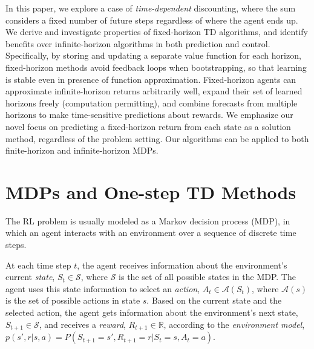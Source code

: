 \documentclass[letterpaper]{article} %
\begin{document}
In this paper, we explore a case of \textit{time-dependent} discounting, where the sum considers a fixed number of future steps regardless of where the agent ends up. We derive and investigate properties of fixed-horizon TD algorithms, and identify benefits over infinite-horizon algorithms in both prediction and control.
%
Specifically, by storing and updating a separate value function for each horizon, fixed-horizon methods avoid feedback loops when bootstrapping, so that learning is stable even in presence of function approximation. Fixed-horizon agents can approximate infinite-horizon returns arbitrarily well, expand their set of learned horizons freely (computation permitting), and combine forecasts from multiple horizons to make time-sensitive predictions about rewards.
%
We emphasize %
our novel focus on predicting a fixed-horizon return from each state as a solution method, regardless of the problem setting. Our algorithms can be applied to both finite-horizon and infinite-horizon MDPs.


\section{MDPs and One-step TD Methods}\label{sec:mdps}

The RL problem is usually modeled as a Markov decision process (MDP), in which an agent interacts with an environment over a sequence of discrete time steps.

At each time step $t$, the agent receives information about the environment's current \textit{state}, $S_t \in \mathcal{S}$, where $\mathcal{S}$ is the set of all possible states in the MDP. The agent uses this state information to select an \textit{action}, $A_t \in \mathcal{A}(S_t)$, where $\mathcal{A}(s)$ is the set of possible actions in state $s$. Based on the current state and the selected action, the agent gets information about the environment's next state, $S_{t+1} \in \mathcal{S}$, and receives a \textit{reward}, $R_{t+1} \in \mathbb{R}$, according to the \textit{environment model}, $p(s',r|s,a)={P(S_{t+1}=s',R_{t+1}=r|S_t=s,A_t=a)}$.
\end{document}
